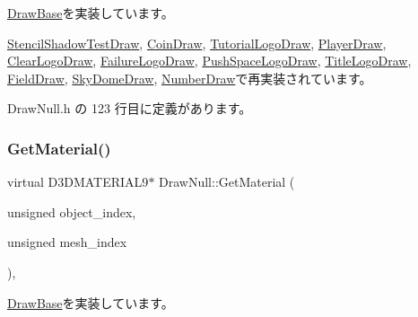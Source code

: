 \mbox{\hyperlink{class_draw_base_a4e36184dbb605bcae13bfb38722ddc24}{Draw\+Base}}を実装しています。



\mbox{\hyperlink{class_stencil_shadow_test_draw_a387a97781f743aa0ea0727c050ef53b2}{Stencil\+Shadow\+Test\+Draw}}, \mbox{\hyperlink{class_coin_draw_a1d4ab1a5c480833b8d8e7fe226136ad5}{Coin\+Draw}}, \mbox{\hyperlink{class_tutorial_logo_draw_ad9df98aa8a5b11872dba6f6609589035}{Tutorial\+Logo\+Draw}}, \mbox{\hyperlink{class_player_draw_a6cecfb28942044efff0b9d6213b511a5}{Player\+Draw}}, \mbox{\hyperlink{class_clear_logo_draw_a04ae25ae9cb59df0d0c346b65baed3f2}{Clear\+Logo\+Draw}}, \mbox{\hyperlink{class_failure_logo_draw_a2a74fafba17b2f63b1c61abd67289afd}{Failure\+Logo\+Draw}}, \mbox{\hyperlink{class_push_space_logo_draw_a4990a9f5662af324f2632e8647cbdde4}{Push\+Space\+Logo\+Draw}}, \mbox{\hyperlink{class_title_logo_draw_ab727012424a02249a90a0f7d247371a8}{Title\+Logo\+Draw}}, \mbox{\hyperlink{class_field_draw_a67eabcc5ffd6697b87e89a1c4ddb95f6}{Field\+Draw}}, \mbox{\hyperlink{class_sky_dome_draw_a1d708782f13648724e423d1dca22b213}{Sky\+Dome\+Draw}}, \mbox{\hyperlink{class_number_draw_ad1d9a4cee49e7bddce51b5c58e739de9}{Number\+Draw}}で再実装されています。



 Draw\+Null.\+h の 123 行目に定義があります。

\mbox{\label{class_draw_null_a84969d22d3436986f214e9896fe44fc6}} 
\subsubsection{\texorpdfstring{Get\+Material()}{GetMaterial()}}
{\footnotesize\ttfamily virtual D3\+D\+M\+A\+T\+E\+R\+I\+A\+L9$\ast$ Draw\+Null\+::\+Get\+Material (\begin{DoxyParamCaption}\item[{unsigned}]{object\+\_\+index,  }\item[{unsigned}]{mesh\+\_\+index }\end{DoxyParamCaption})\hspace{0.3cm}{\ttfamily [inline]}, {\ttfamily [virtual]}}



\mbox{\hyperlink{class_draw_base_ad82a75dff8e4e2f2ebbec2dd0d0734e5}{Draw\+Base}}を実装しています。




